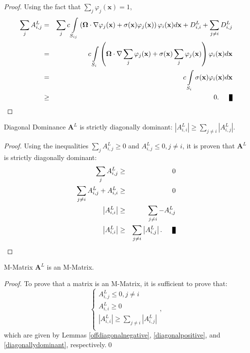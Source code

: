 \begin{proof}
Using the fact that $\sum\limits_j\varphi_j(\mathbf{x})=1$,
\begin{eqnarray*}
	\sum\limits_j A^L_{i,j} & = & \sum\limits_j c\int\limits_{S_{ij}}
      \left(\mathbf{\Omega}\cdot\nabla\varphi_j(\mathbf{x}) +
		\sigma(\mathbf{x})\varphi_j(\mathbf{x})\right)\varphi_i(\mathbf{x}) d\mathbf{x} +
		D_{i,i}^L + \sum\limits_{j\neq i}D_{i,j}^L\\
		& = & c\int\limits_{S_{i}}\left(\mathbf{\Omega}\cdot
         \nabla\sum\limits_j\varphi_j(\mathbf{x}) +
         \sigma(\mathbf{x})\sum\limits_j\varphi_j(\mathbf{x})\right)
         \varphi_i(\mathbf{x}) d\mathbf{x}\\
		\label{rowsum} & = & c\int\limits_{S_{i}}\sigma(\mathbf{x})
         \varphi_i(\mathbf{x}) d\mathbf{x}\\
		&\ge& 0.\qed
\end{eqnarray*}
\end{proof}
\begin{lemma}[label={diagonallydominant}]{Diagonal Dominance}
   $\mathbf{A}^L$ is strictly diagonally dominant:
   $\left|A^L_{i,i}\right| \ge \sum\limits_{j\ne i} \left|A^L_{i,j}\right|$.
\end{lemma}
\begin{proof}
Using the inequalities $\sum\limits_j A^L_{i,j} \ge 0$ and $A^L_{i,j}\le 0, j\ne i$,
it is proven that $\mathbf{A}^L$ is strictly diagonally dominant:
\begin{eqnarray*}
	\sum\limits_j A^L_{i,j} & \ge & 0\\
	\sum\limits_{j\ne i} A^L_{i,j} + A^L_{i,i} & \ge & 0\\
	\left|A^L_{i,i}\right| & \ge & \sum\limits_{j\ne i} -A^L_{i,j}\\
	\left|A^L_{i,i}\right| & \ge & \sum\limits_{j\ne i} \left|A^L_{i,j}\right|.\qed
\end{eqnarray*}
\end{proof}
\begin{lemma}{M-Matrix}
   $\mathbf{A}^L$ is an M-Matrix.
\end{lemma}
\begin{proof}
To prove that a matrix is an M-Matrix, it is sufficient to prove that:
\[
\left\{\begin{array}{l}
A^L_{i,j}\le 0, j\ne i\\
A^L_{i,i}\ge 0\\
\left|A^L_{i,i}\right| \ge \sum\limits_{j\ne i} \left|A^L_{i,j}\right|\\
\end{array}
\right.,
\]
which are given by Lemmas \ref{offdiagonalnegative}, \ref{diagonalpositive}, and
\ref{diagonallydominant}, respectively.\qed
\end{proof}
